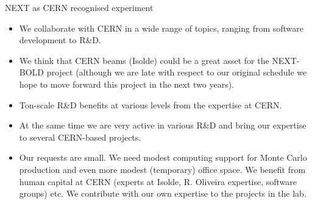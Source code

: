 \documentclass [aspectratio=169]{beamer}
\newcommand{\TL}{\ensuremath{{}^{208}{\rm Tl}}}
\newcommand{\BI}{\ensuremath{{}^{214}{\rm Bi}}}
\newcommand{\XES}{\ensuremath{{}^{137}{\rm Xe}}}
\begin{document}
\begin{frame}{NEXT as CERN recognised experiment}

\begin{itemize}
\item We collaborate with CERN in a wide range of topics, ranging from software development to R\&D.  
\item We think that CERN beams (Isolde) could be a great asset for the NEXT-BOLD project (although we are late with respect to our original schedule we hope to move forward this project in the next two years). 
\item Ton-scale R\&D benefits at various levels from the expertise at CERN.
\item At the same time we are very active in various R\&D and bring our expertise to several CERN-based projects.
\item Our requests are small. We need modest computing support for Monte Carlo production and even more modest (temporary) office space. We benefit from human capital at CERN (experts at Isolde, R. Oliveira expertise, software groups) etc. We contribute with our own expertise to the projects in the lab.
\end{itemize}


\end{frame}


%
%
%
%
%
%
%
%
%
%
%
%
%
\end{document}
